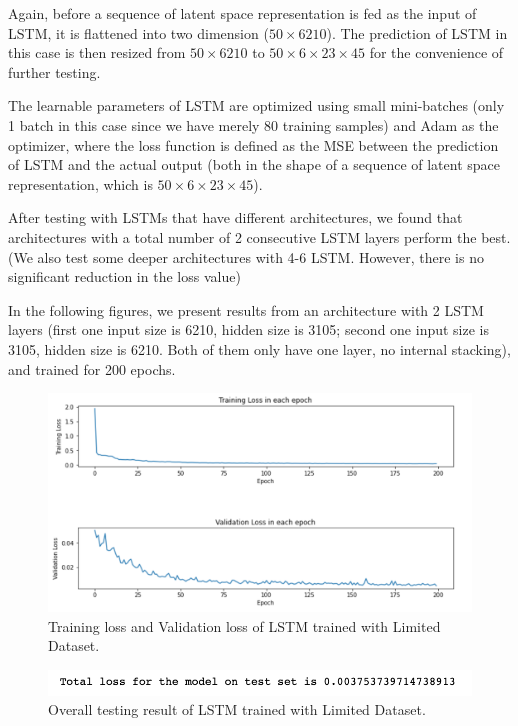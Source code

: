 Again, before a sequence of latent space representation is fed as the input of LSTM, it is flattened into two dimension ($50 \times 6210$). The prediction of LSTM in this case is then resized from $50 \times 6210$ to $50 \times 6 \times 23 \times 45$ for the convenience of further testing.

The learnable parameters of LSTM are optimized using small mini-batches (only 1 batch in this case since we have merely 80 training samples) and Adam as the optimizer, where the loss function is defined as the MSE between the prediction of LSTM and the actual output (both in the shape of a sequence of latent space representation, which is $50 \times 6 \times 23 \times 45$).

After testing with LSTMs that have different architectures, we found that architectures with a total number of 2 consecutive LSTM layers perform the best. (We also test some deeper architectures with 4-6 LSTM. However, there is no significant reduction in the loss value)

In the following figures, we present results from an architecture with 2 LSTM layers (first one input size is 6210, hidden size is 3105; second one input size is 3105, hidden size is 6210. Both of them only have one layer, no internal stacking), and trained for 200 epochs.

\begin{figure}[H]
    \caption{Training loss and Validation loss of LSTM trained with Limited Dataset.}
    \includegraphics[scale=0.6]{figures/mantle_convection_images/limited_dataset/LSTM_trainingData.png}
\end{figure}

\begin{figure}[H]
    \caption{Overall testing result of LSTM trained with Limited Dataset.}
    \includegraphics[scale=0.8]{figures/mantle_convection_images/limited_dataset/LSTM_OverallTesting.png}
\end{figure}

